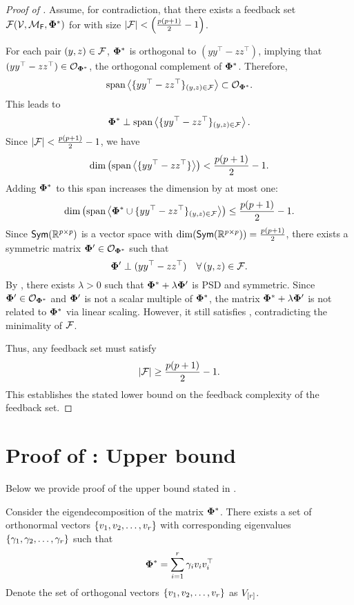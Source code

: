 \fi
\begin{proof}[Proof of ] 
Assume, for contradiction, that there exists a feedback set ${\mathcal{F}}({\mathcal{V}}, {\mathcal{M}}_{\textsf{F}}, \boldsymbol{\Phi}^*)$ for  with size $|{\mathcal{F}}| < \left(\frac{p(p+1)}{2} - 1\right)$.

For each pair $(y,z) \in {\mathcal{F}}$, $\boldsymbol{\Phi}^*$ is orthogonal to $(yy^{\top} - zz^{\top})$, implying that $(yy^{\top} - zz^{\top}) \in \mathcal{O}_{\boldsymbol{\Phi}^*}$, the orthogonal complement of $\boldsymbol{\Phi}^*$. Therefore,
\[
\text{span}\left<\{yy^{\top} - zz^{\top}\}_{(y,z) \in {\mathcal{F}}}\right> \subset \mathcal{O}_{\boldsymbol{\Phi}^*}.
\]
This leads to
\[
\boldsymbol{\Phi}^* \perp \text{span}\left<\{yy^{\top} - zz^{\top}\}_{(y,z) \in {\mathcal{F}}}\right>.
\]
Since $|{\mathcal{F}}| < \frac{p(p+1)}{2} - 1$, we have
\[
\dim \left( \text{span}\left< \{yy^{\top} - zz^{\top}\} \right> \right) < \frac{p(p+1)}{2} - 1.
\]
Adding $\boldsymbol{\Phi}^*$ to this span increases the dimension by at most one:
\[
\dim \left( \text{span}\left< \boldsymbol{\Phi}^* \cup \{yy^{\top} - zz^{\top}\}_{(y,z) \in {\mathcal{F}}} \right> \right) \leq \frac{p(p+1)}{2} - 1.
\]
Since $\textsf{Sym}(\mathbb{R}^{p\times p})$ is a vector space with $\dim(\textsf{Sym}(\mathbb{R}^{p\times p})) = \frac{p(p+1)}{2}$, there exists a symmetric matrix $\boldsymbol{\Phi}' \in \mathcal{O}_{\boldsymbol{\Phi}^*}$ such that
\[
\boldsymbol{\Phi}' \perp (yy^{\top} - zz^{\top}) \quad \forall \, (y,z) \in {\mathcal{F}}.
\]
By , there exists $\lambda > 0$ such that $\boldsymbol{\Phi}^* + \lambda \boldsymbol{\Phi}'$ is PSD and symmetric. Since $\boldsymbol{\Phi}' \in \mathcal{O}_{\boldsymbol{\Phi}^*}$ and $\boldsymbol{\Phi}'$ is not a scalar multiple of $\boldsymbol{\Phi}^*$, the matrix $\boldsymbol{\Phi}^* + \lambda \boldsymbol{\Phi}'$ is not related to $\boldsymbol{\Phi}^*$ via linear scaling. However, it still satisfies , contradicting the minimality of ${\mathcal{F}}$.

Thus, any feedback set must satisfy
\[
|{\mathcal{F}}| \geq \frac{p(p+1)}{2} - 1.
\]
This establishes the stated lower bound on the feedback complexity of the feedback set.
\end{proof}

\section{Proof of : Upper bound}\label{app: constub}
Below we provide proof of the upper bound stated in . 


Consider the eigendecomposition of the matrix $\boldsymbol{\Phi}^*$. There exists a set of orthonormal vectors $\left\{v_1, v_2, \ldots, v_r\right\}$ with corresponding eigenvalues $\left\{\gamma_1, \gamma_2, \ldots, \gamma_r\right\}$ such that
\begin{align}
    \boldsymbol{\Phi}^* = \sum_{i=1}^r \gamma_i v_i v_i^{\top} \label{eq: target}
\end{align}
Denote the set of orthogonal vectors $\left\{v_1, v_2, \ldots, v_r\right\}$ as $V_{\left[r\right]}$.

